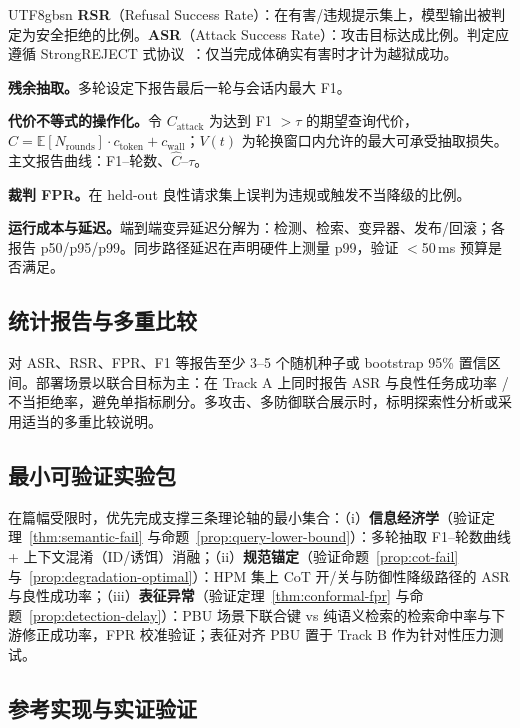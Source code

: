 \documentclass[letterpaper,twocolumn,10pt]{article}
\begin{document}
\begin{CJK}{UTF8}{gbsn}
\textbf{RSR}（Refusal Success Rate）：在有害/违规提示集上，模型输出被判定为安全拒绝的比例。\textbf{ASR}（Attack Success Rate）：攻击目标达成比例。判定应遵循 StrongREJECT 式协议~\cite{strongreject}：仅当完成体确实有害时才计为越狱成功。

\textbf{残余抽取。}多轮设定下报告最后一轮与会话内最大 F1。

\textbf{代价不等式的操作化。}令 $C_{\mathrm{attack}}$ 为达到 F1 $>\tau$ 的期望查询代价，$\hat{C} = \mathbb{E}[N_{\mathrm{rounds}}] \cdot c_{\mathrm{token}} + c_{\mathrm{wall}}$；$V(t)$ 为轮换窗口内允许的最大可承受抽取损失。主文报告曲线：F1--轮数、$\hat{C}$--$\tau$。

\textbf{裁判 FPR。}在 held-out 良性请求集上误判为违规或触发不当降级的比例。

\textbf{运行成本与延迟。}端到端变异延迟分解为：检测、检索、变异器、发布/回滚；各报告 p50/p95/p99。同步路径延迟在声明硬件上测量 p99，验证 $<$50\,ms 预算是否满足。

\subsection{统计报告与多重比较}
\label{sec:eval-stats}

对 ASR、RSR、FPR、F1 等报告至少 3--5 个随机种子或 bootstrap 95\% 置信区间。部署场景以联合目标为主：在 Track A 上同时报告 ASR 与良性任务成功率 / 不当拒绝率，避免单指标刷分。多攻击、多防御联合展示时，标明探索性分析或采用适当的多重比较说明。

\subsection{最小可验证实验包}
\label{sec:eval-minimal}

在篇幅受限时，优先完成支撑三条理论轴的最小集合：（i）\textbf{信息经济学}（验证定理~\ref{thm:semantic-fail} 与命题~\ref{prop:query-lower-bound}）：多轮抽取 F1--轮数曲线 + 上下文混淆（ID/诱饵）消融；（ii）\textbf{规范锚定}（验证命题~\ref{prop:cot-fail} 与~\ref{prop:degradation-optimal}）：HPM 集上 CoT 开/关与防御性降级路径的 ASR 与良性成功率；（iii）\textbf{表征异常}（验证定理~\ref{thm:conformal-fpr} 与命题~\ref{prop:detection-delay}）：PBU 场景下联合键 vs 纯语义检索的检索命中率与下游修正成功率，FPR 校准验证；表征对齐 PBU 置于 Track B 作为针对性压力测试。

\subsection{参考实现与实证验证}
\label{sec:eval-artifact}


\end{CJK}
\end{document}
